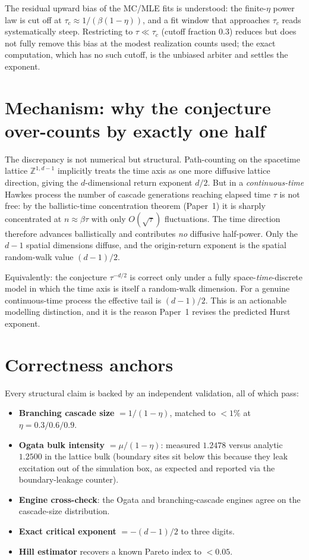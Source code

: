 \documentclass[11pt,a4paper]{article}
\begin{document}
The residual upward bias of the MC/MLE fits is understood: the finite-$\eta$ power law is cut off at $\tau_c\approx1/(\beta(1-\eta))$, and a fit window that approaches $\tau_c$ reads systematically steep. Restricting to $\tau\ll\tau_c$ (cutoff fraction $0.3$) reduces but does not fully remove this bias at the modest realization counts used; the exact computation, which has no such cutoff, is the unbiased arbiter and settles the exponent.

\section{Mechanism: why the conjecture over-counts by exactly one half}

The discrepancy is not numerical but structural. Path-counting on the spacetime lattice $\mathbb{Z}^{1,d-1}$ implicitly treats the time axis as one more diffusive lattice direction, giving the $d$-dimensional return exponent $d/2$. But in a \emph{continuous-time} Hawkes process the number of cascade generations reaching elapsed time $\tau$ is not free: by the ballistic-time concentration theorem (Paper~1) it is sharply concentrated at $n\approx\beta\tau$ with only $O(\sqrt{\tau})$ fluctuations. The time direction therefore advances ballistically and contributes \emph{no} diffusive half-power. Only the $d-1$ spatial dimensions diffuse, and the origin-return exponent is the spatial random-walk value $(d-1)/2$.

Equivalently: the conjecture $\tau^{-d/2}$ is correct only under a fully space-\emph{time}-discrete model in which the time axis is itself a random-walk dimension. For a genuine continuous-time process the effective tail is $(d-1)/2$. This is an actionable modelling distinction, and it is the reason Paper~1 revises the predicted Hurst exponent.

\section{Correctness anchors}

Every structural claim is backed by an independent validation, all of which pass:
\begin{itemize}
\item \textbf{Branching cascade size} $=1/(1-\eta)$, matched to $<1\%$ at $\eta=0.3/0.6/0.9$.
\item \textbf{Ogata bulk intensity} $=\mu/(1-\eta)$: measured $1.2478$ versus analytic $1.2500$ in the lattice bulk (boundary sites sit below this because they leak excitation out of the simulation box, as expected and reported via the boundary-leakage counter).
\item \textbf{Engine cross-check}: the Ogata and branching-cascade engines agree on the cascade-size distribution.
\item \textbf{Exact critical exponent} $=-(d-1)/2$ to three digits.
\item \textbf{Hill estimator} recovers a known Pareto index to $<0.05$.
\end{itemize}
\end{document}
